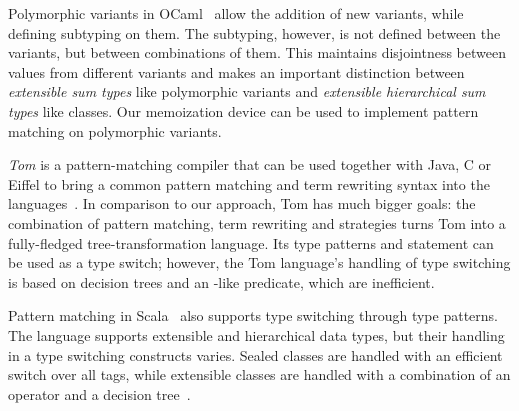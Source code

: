 Polymorphic variants in OCaml~\cite{garrigue-98} allow the addition of new 
variants, while defining subtyping on them. The subtyping, however, is not 
defined between the variants, but between combinations of them. 
This maintains disjointness between values from different variants and makes an 
important distinction between \emph{extensible sum types} like polymorphic 
variants and \emph{extensible hierarchical sum types} like classes. Our 
memoization device can be used to implement pattern matching on polymorphic 
variants.

\emph{Tom} is a pattern-matching compiler that can be used together with Java, C or 
Eiffel to bring a common pattern matching and term rewriting syntax into the 
languages~\cite{Moreau:2003}. In comparison to our approach, Tom has much bigger 
goals: the combination of pattern matching, term rewriting and strategies turns 
Tom into a fully-fledged tree-transformation language. Its type patterns and 
statement can be used as a type switch; however, the Tom language's handling of type 
switching is based on decision trees and an -like predicate, 
which are inefficient.

Pattern matching in Scala~\cite{Scala2nd} also supports type switching through 
type patterns. The language supports extensible and hierarchical data types, but
their handling in a type switching constructs varies. Sealed classes are handled 
with an efficient switch over all tags, while extensible classes are  
handled with a combination of an  operator and a decision 
tree~\cite{EmirThesis}.